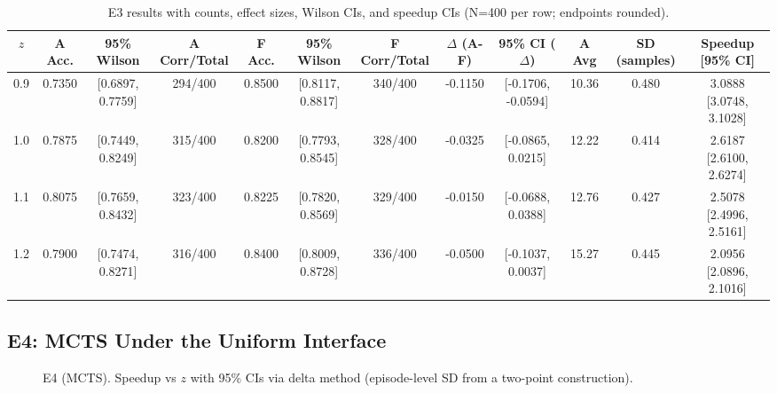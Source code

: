 \begin{table}[H]
  \centering
  \caption{E3 results with counts, effect sizes, Wilson CIs, and speedup CIs (N=400 per row; endpoints rounded).}
  \vspace{0.25em}
  \begin{adjustbox}{width=\linewidth}
  \begin{tabular}{c c c c c c c c c c c c}
    \toprule
    $z$ & A Acc. & 95\% Wilson & A Corr/Total & F Acc. & 95\% Wilson & F Corr/Total & $\Delta$ (A-F) & 95\% CI ($\Delta$) & A Avg & SD (samples) & Speedup [95\% CI] \\
    \midrule
    0.9 & 0.7350 & [0.6897, 0.7759] & 294/400 & 0.8500 & [0.8117, 0.8817] & 340/400 & -0.1150 & [-0.1706, -0.0594] & 10.36 & 0.480 & 3.0888 [3.0748, 3.1028] \\
    1.0 & 0.7875 & [0.7449, 0.8249] & 315/400 & 0.8200 & [0.7793, 0.8545] & 328/400 & -0.0325 & [-0.0865, 0.0215] & 12.22 & 0.414 & 2.6187 [2.6100, 2.6274] \\
    1.1 & 0.8075 & [0.7659, 0.8432] & 323/400 & 0.8225 & [0.7820, 0.8569] & 329/400 & -0.0150 & [-0.0688, 0.0388] & 12.76 & 0.427 & 2.5078 [2.4996, 2.5161] \\
    1.2 & 0.7900 & [0.7474, 0.8271] & 316/400 & 0.8400 & [0.8009, 0.8728] & 336/400 & -0.0500 & [-0.1037, 0.0037] & 15.27 & 0.445 & 2.0956 [2.0896, 2.1016] \\
    \bottomrule
  \end{tabular}
  \end{adjustbox}
\end{table}

\subsection{E4: MCTS Under the Uniform Interface}
\begin{figure}[H]
  \centering
  \begin{adjustbox}{width=\linewidth}
  \end{adjustbox}
  \caption{E4 (MCTS). Speedup vs $z$ with 95\% CIs via delta method (episode-level SD from a two-point construction).}
  \label{fig:e4a}
\end{figure}

